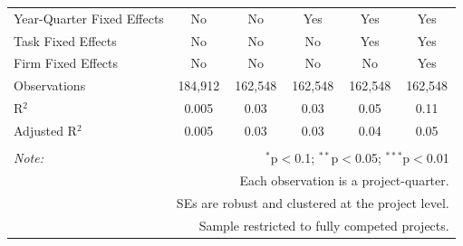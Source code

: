 \documentclass[]{article}
\begin{document}
\begin{table}[H]
\begin{tabular}{@{\extracolsep{-2pt}}lccccc}
Year-Quarter Fixed Effects & No & No & Yes & Yes & Yes \\ 
Task Fixed Effects & No & No & No & Yes & Yes \\ 
Firm Fixed Effects & No & No & No & No & Yes \\ 
Observations & 184,912 & 162,548 & 162,548 & 162,548 & 162,548 \\ 
R$^{2}$ & 0.005 & 0.03 & 0.03 & 0.05 & 0.11 \\ 
Adjusted R$^{2}$ & 0.005 & 0.03 & 0.03 & 0.04 & 0.05 \\ 
\hline 
\hline \\[-1.8ex] 
\textit{Note:}  & \multicolumn{5}{r}{$^{*}$p$<$0.1; $^{**}$p$<$0.05; $^{***}$p$<$0.01} \\ 
 & \multicolumn{5}{r}{Each observation is a project-quarter.} \\ 
 & \multicolumn{5}{r}{SEs are robust and clustered at the project level.} \\ 
 & \multicolumn{5}{r}{Sample restricted to fully competed projects.} \\ 
\end{tabular} 
\end{table}
\end{document}
